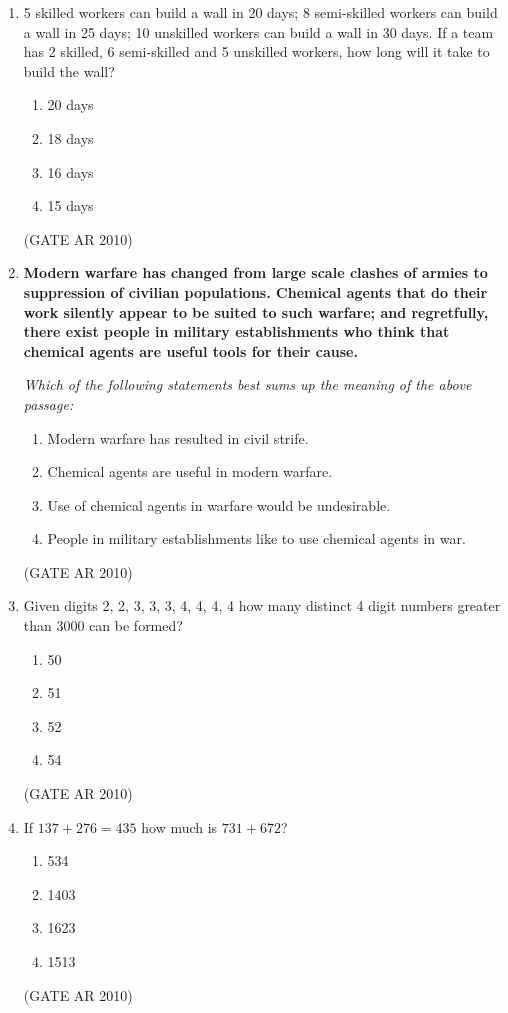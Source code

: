 \documentclass[journal]{IEEEtran}
\begin{document}
\begin{enumerate}
\item 5 skilled workers can build a wall in 20 days; 8 semi-skilled workers can build a wall in 25 days; 10 unskilled workers can build a wall in 30 days. If a team has 2 skilled, 6 semi-skilled and 5 unskilled workers, how long will it take to build the wall?
\begin{multicols}{4}
\begin{enumerate}
\item 20 days
\item 18 days
\item 16 days
\item 15 days
\end{enumerate}
\end{multicols}
\hfill (GATE AR 2010)

\item \textbf{Modern warfare has changed from large scale clashes of armies to suppression of civilian populations. Chemical agents that do their work silently appear to be suited to such warfare; and regretfully, there exist people in military establishments who think that chemical agents are useful tools for their cause.}

\textit{Which of the following statements best sums up the meaning of the above passage:}

\begin{enumerate}
\item Modern warfare has resulted in civil strife.
\item Chemical agents are useful in modern warfare.
\item Use of chemical agents in warfare would be undesirable.
\item People in military establishments like to use chemical agents in war.
\end{enumerate}
\hfill (GATE AR 2010)

\item Given digits 2, 2, 3, 3, 3, 4, 4, 4, 4 how many distinct 4 digit numbers greater than 3000 can be formed?
\begin{multicols}{4}
\begin{enumerate}
\item 50
\item 51
\item 52
\item 54
\end{enumerate}
\end{multicols}
\hfill (GATE AR 2010)

\item If $137 + 276 = 435$ how much is $731 + 672$?
\begin{multicols}{4}
\begin{enumerate}
\item 534
\item 1403
\item 1623
\item 1513
\end{enumerate}
\end{multicols}
\hfill (GATE AR 2010)

\end{enumerate}
\end{document}
